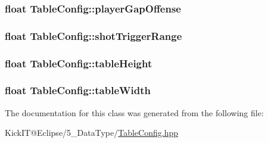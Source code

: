 \subsubsection[{\texorpdfstring{player\+Gap\+Offense}{playerGapOffense}}]{\setlength{\rightskip}{0pt plus 5cm}float Table\+Config\+::player\+Gap\+Offense}\hypertarget{class_table_config_a8788da31ad50cf733c0d20cb091cf6e9}{}\label{class_table_config_a8788da31ad50cf733c0d20cb091cf6e9}
\subsubsection[{\texorpdfstring{shot\+Trigger\+Range}{shotTriggerRange}}]{\setlength{\rightskip}{0pt plus 5cm}float Table\+Config\+::shot\+Trigger\+Range}\hypertarget{class_table_config_abbcfb5107f992ebfc458d4123a2fc490}{}\label{class_table_config_abbcfb5107f992ebfc458d4123a2fc490}
\subsubsection[{\texorpdfstring{table\+Height}{tableHeight}}]{\setlength{\rightskip}{0pt plus 5cm}float Table\+Config\+::table\+Height}\hypertarget{class_table_config_a8234f8b9c9f4c28e87e5f0cc5d4cff0f}{}\label{class_table_config_a8234f8b9c9f4c28e87e5f0cc5d4cff0f}
\subsubsection[{\texorpdfstring{table\+Width}{tableWidth}}]{\setlength{\rightskip}{0pt plus 5cm}float Table\+Config\+::table\+Width}\hypertarget{class_table_config_a1a38ba8277209a5e9b87b49c5291260b}{}\label{class_table_config_a1a38ba8277209a5e9b87b49c5291260b}


The documentation for this class was generated from the following file\+:\begin{DoxyCompactItemize}
\item 
Kick\+I\+T@\+Eclipse/5\+\_\+\+Data\+Type/\hyperlink{_table_config_8hpp}{Table\+Config.\+hpp}\end{DoxyCompactItemize}
